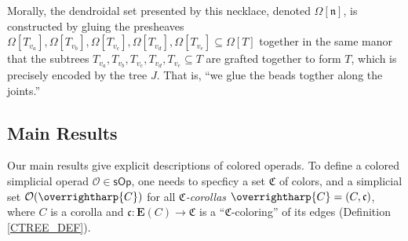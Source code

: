 \documentclass[a4paper,10pt
,draft
]{article}%
\numberwithin{equation}{section}
\numberwithin{figure}{section}
\theoremstyle{definition} %
\newcommand{\vect}[1]{\text{\overrightharp{\ensuremath{#1}}}}
\newcommand{\sOp}{\ensuremath{\mathsf{sOp}}}%
\renewcommand{\O}{\ensuremath{\mathcal O}}
\newcommand{\1}{\ensuremath{\mathbbm 1}}%
\begin{document}
Morally, the dendroidal set presented by this necklace, denoted $\Omega[\mathfrak n]$, is constructed by
gluing the presheaves
$\Omega[T_{v_a}], \Omega[T_{v_b}], \Omega[T_{v_c}], \Omega[T_{v_d}], \Omega[T_{v_e}] \subseteq \Omega[T]$
together
in the same manor that the subtrees
$T_{v_a}, T_{v_b}, T_{v_c}, T_{v_d}, T_{v_e} \subseteq T$
are grafted together to form $T$,
which is precisely encoded by the tree $J$.
That is, ``we glue the beads togther along the joints.''




\subsection{Main Results}


Our main results give explicit descriptions of colored operads.
To define a colored simplicial operad $\O \in \sOp$, one needs to specficy
a set $\mathfrak C$ of colors,
and a simplicial set $\O(\vect C)$ for all \textit{$\mathfrak C$-corollas} $\vect C = (C, \mathfrak c)$,
where $C$ is a corolla and $\mathfrak c \colon \boldsymbol{E}(C) \to \mathfrak C$ is a ``$\mathfrak C$-coloring'' of its edges (Definition \ref{CTREE_DEF}).
\end{document}
